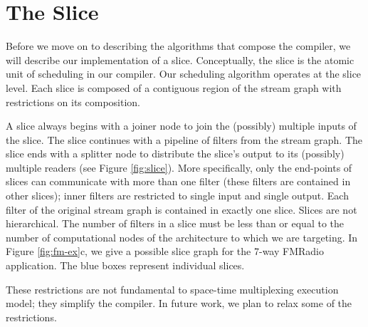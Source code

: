 \section{The Slice}
Before we move on to describing the algorithms that compose the
compiler, we will describe our implementation of a
slice. Conceptually, the slice is the atomic unit of scheduling in our
compiler.  Our scheduling algorithm operates at the slice level.
Each slice is composed of a contiguous region of the stream
graph with restrictions on its composition. 

A slice always begins with a joiner node to join the (possibly)
multiple inputs of the slice.  The slice continues with a pipeline of
filters from the stream graph.  The slice ends with a splitter node to
distribute the slice's output to its (possibly) multiple readers (see
Figure \ref{fig:slice}).  More specifically, only the end-points of
slices can communicate with more than one filter (these filters are
contained in other slices); inner filters are restricted to single
input and single output.  Each filter of the original stream graph is
contained in exactly one slice.  Slices are not hierarchical.  The
number of filters in a slice must be less than or equal to the number
of computational nodes of the architecture to which we are targeting.
In Figure \ref{fig:fm-ex}c, we give a possible slice graph for the
7-way FMRadio application.  The blue boxes represent individual
slices.

These restrictions are not fundamental to space-time multiplexing
execution model; they simplify the compiler.  In future work, we plan
to relax some of the restrictions.

